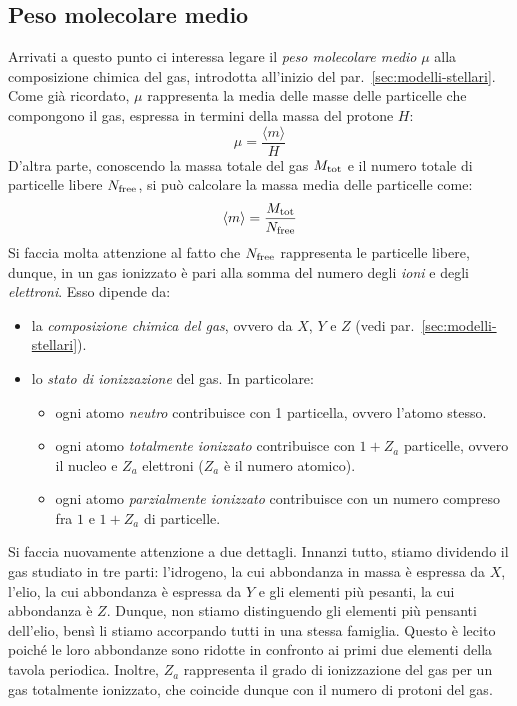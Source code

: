 \subsection{Peso molecolare medio}\label{sec:peso-molecolare}
Arrivati a questo punto ci interessa legare il \emph{peso molecolare medio} $\mu$ alla composizione chimica del gas, introdotta all'inizio del par.~\ref{sec:modelli-stellari}. Come già ricordato, $\mu$ rappresenta la media delle masse delle particelle che compongono il gas, espressa in termini della massa del protone $H$:
\begin{equation}\label{eq:peso-molecolare-medio-definizione}
    \mu = \frac{\langle m \rangle}{H}
\end{equation}
D'altra parte, conoscendo la massa totale del gas $M_\textup{tot}$ e il numero totale di particelle libere $N_\textup{free}$, si può calcolare la massa media delle particelle come:
\begin{equation}\label{eq:massa-media-particelle}
    \langle m \rangle = \frac{M_\textup{tot}}{N_\textup{free}}
\end{equation}
Si faccia molta attenzione al fatto che $N_\textup{free}$ rappresenta le particelle libere, dunque, in un gas ionizzato è pari alla somma del numero degli \emph{ioni} e degli \emph{elettroni}. Esso dipende da:
\begin{itemize}
    \item la \emph{composizione chimica del gas}, ovvero da $X$, $Y$ e $Z$ (vedi par.~\ref{sec:modelli-stellari}).
    \item lo \emph{stato di ionizzazione} del gas. In particolare:
    \begin{itemize}
        \item ogni atomo \emph{neutro} contribuisce con 1 particella, ovvero l'atomo stesso.
        \item ogni atomo \emph{totalmente ionizzato} contribuisce con $1+Z_a$ particelle, ovvero il nucleo e $Z_a$ elettroni ($Z_a$ è il numero atomico).
        \item ogni atomo \emph{parzialmente ionizzato} contribuisce con un numero compreso fra $1$ e $1+Z_a$ di particelle.
    \end{itemize}
\end{itemize}
Si faccia nuovamente attenzione a due dettagli. Innanzi tutto, stiamo dividendo il gas studiato in tre parti: l'idrogeno, la cui abbondanza in massa è espressa da $X$, l'elio, la cui abbondanza è espressa da $Y$ e gli elementi più pesanti, la cui abbondanza è $Z$. Dunque, non stiamo distinguendo gli elementi più pensanti dell'elio, bensì li stiamo accorpando tutti in una stessa famiglia. Questo è lecito poiché le loro abbondanze sono ridotte in confronto ai primi due elementi della tavola periodica. Inoltre, $Z_a$ rappresenta il grado di ionizzazione del gas per un gas totalmente ionizzato, che coincide dunque con il numero di protoni del gas.


